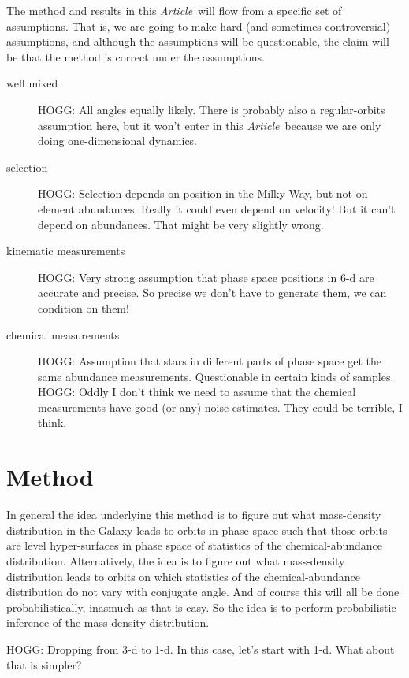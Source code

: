 \documentclass[modern]{aastex62}
\newcommand{\documentname}{\textsl{Article}}
\begin{document}
The method and results in this \documentname\ will flow from a specific set of
assumptions.
That is, we are going to make hard (and sometimes controversial) assumptions,
and although the assumptions will be questionable, the claim will be that the
method is correct under the assumptions.
\begin{description}
\item[well mixed] HOGG: All angles equally likely. There is probably also a regular-orbits
assumption here, but it won't enter in this \documentname\ because we are only doing
one-dimensional dynamics.

\item[selection] HOGG: Selection depends on position in the Milky Way, but not
on element abundances. Really it could even depend on velocity! But it can't depend
on abundances. That might be very slightly wrong.

\item[kinematic measurements] HOGG: Very strong assumption that phase space positions
in 6-d are accurate and precise. So precise we don't have to generate them, we can
condition on them!

\item[chemical measurements] HOGG: Assumption that stars in different parts of phase
space get the same abundance measurements. Questionable in certain kinds of samples.
HOGG: Oddly I don't think we need to assume that the chemical measurements have good
(or any) noise estimates. They could be terrible, I think.
\end{description}

\section{Method}

In general the idea underlying this method is to figure out what mass-density distribution
in the Galaxy leads to orbits in phase space such that those orbits are level
hyper-surfaces in phase space of statistics of the chemical-abundance distribution.
Alternatively, the idea is to figure out what mass-density distribution leads to orbits
on which statistics of the chemical-abundance distribution do not vary with conjugate
angle.
And of course this will all be done probabilistically, inasmuch as that is easy.
So the idea is to perform probabilistic inference of the mass-density distribution.

HOGG: Dropping from 3-d to 1-d. In this case, let's start with 1-d. What about that is simpler?
\end{document}
